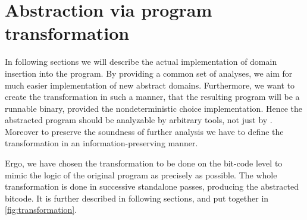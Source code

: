 \section{Abstraction via program transformation}

In following sections we will describe the actual implementation of domain
insertion into the program. By providing a common set of analyses, we aim for
much easier implementation of new abstract domains. Furthermore, we want to
create the transformation in such a manner, that the resulting program will be a
runnable binary, provided the nondeterministic choice implementation. Hence the abstracted program should be
analyzable by arbitrary tools, not just by \DIVINE. Moreover to preserve
the soundness of further analysis we have to define the transformation in an
information-preserving manner.

Ergo, we have chosen the transformation to be done on the \LLVM bit-code level to
mimic the logic of the original program as precisely as possible. The whole
transformation is done in successive standalone \LLVM passes, producing the
abstracted \LLVM bitcode. It is further described in following sections, and put
together in \autoref{fig:transformation}.

